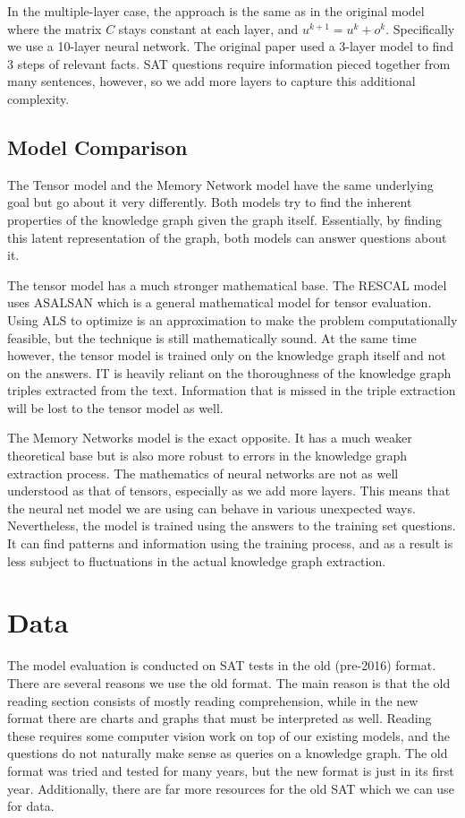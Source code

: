 \documentclass[pageno]{jpaper}
\begin{document}
In the multiple-layer case, the approach is the same as in the original model
where the matrix $C$ stays constant at each layer, and $u^{k+1} = u^k + o^k$.
Specifically we use a 10-layer neural network. The original paper used a 3-layer
model to find 3 steps of relevant facts. SAT questions require information
pieced together from many sentences, however, so we add more layers to capture
this additional complexity.

\subsection{Model Comparison}
\label{Model Comparison}

The Tensor model and the Memory Network model have the same underlying goal but
go about it very differently. Both models try to find the inherent properties
of the knowledge graph given the graph itself. Essentially, by finding this
latent representation of the graph, both models can answer questions about it.

The tensor model has a much stronger mathematical base. The RESCAL model uses
ASALSAN \cite{Bader2007} which is a general mathematical model for tensor
evaluation. Using ALS to optimize is an approximation to make the problem
computationally feasible, but the technique is still mathematically sound. At
the same time however, the tensor model is trained only on the knowledge graph
itself and not on the answers. IT is heavily reliant on the thoroughness of the
knowledge graph triples extracted from the text. Information that is missed in
the triple extraction will be lost to the tensor model as well.

The Memory Networks model is the exact opposite. It has a much weaker
theoretical base but is also more robust to errors in the knowledge graph
extraction process. The mathematics of neural networks are not as well
understood as that of tensors, especially as we add more layers. This means that
the neural net model we are using can behave in various unexpected ways.
Nevertheless, the model is trained using the answers to the training set
questions. It can find patterns and information using the training process, and
as a result is less subject to fluctuations in the actual knowledge graph
extraction.

\section{Data}
\label{Data}

The model evaluation is conducted on SAT tests in the old (pre-2016) format.
There are several reasons we use the old format. The main reason is that the old
reading section consists of mostly reading comprehension, while in the new
format there are charts and graphs that must be interpreted as well. Reading
these requires some computer vision work on top of our existing models, and the
questions do not naturally make sense as queries on a knowledge graph. The old
format was tried and tested for many years, but the new format is just in its
first year. Additionally, there are far more resources for the old SAT which we
can use for data.
\end{document}
